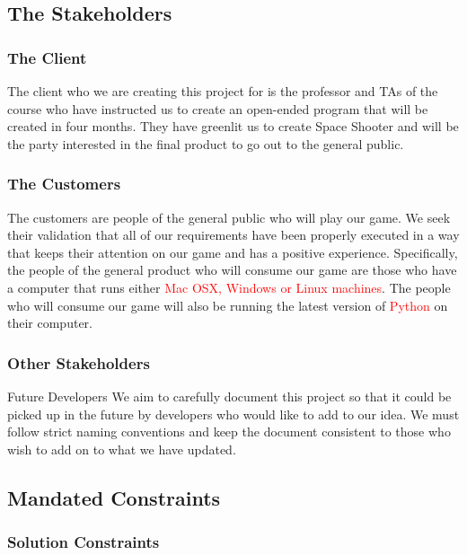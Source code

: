 \documentclass[12pt, titlepage]{article}
\begin{document}
\subsection{The Stakeholders}
 

\subsubsection{The Client}

The client who we are creating this project for is the professor and TAs of the course who have instructed us to create an open-ended program that will be created in four months. They have greenlit us to create Space Shooter and will be the party interested in the final product to go out to the general public.

\subsubsection{The Customers}

The customers are people of the general public who will play our game. We seek their validation that all of our requirements have been properly executed in a way that keeps their attention on our game and has a positive experience. Specifically, the people of the general product who will consume our game are those who have a computer that runs either \textcolor{red}{Mac OSX, Windows or Linux machines}. The people who will consume our game will also be running the latest version of \textcolor{red}{Python} on their computer. 

\subsubsection{Other Stakeholders}

Future Developers
We aim to carefully document this project so that it could be picked up in the future by developers who would like to add to our idea. We must follow strict naming conventions and keep the document consistent to those who wish to add on to what we have updated.

\newpage

\subsection{Mandated Constraints}

\subsubsection{Solution Constraints}
\end{document}
